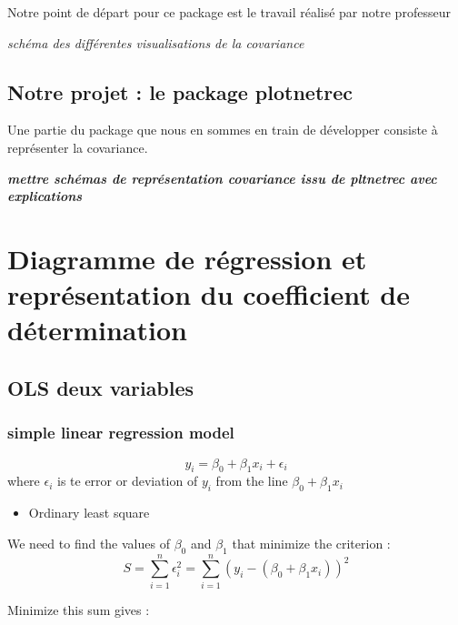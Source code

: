 \documentclass[
]{report}
\providecommand{\tightlist}{%
  \setlength{\itemsep}{0pt}\setlength{\parskip}{0pt}}
\begin{document}
Notre point de départ pour ce package est le travail réalisé par notre professeur \citep{bousquet}

\emph{schéma des différentes visualisations de la covariance}

\hypertarget{notre-projet-le-package-plotnetrec}{%
\section{Notre projet : le package plotnetrec}\label{notre-projet-le-package-plotnetrec}}

Une partie du package que nous en sommes en train de développer consiste à représenter la covariance.

\textbf{\emph{mettre schémas de représentation covariance issu de pltnetrec avec explications}}

\hypertarget{diagramme-de-ruxe9gression-et-repruxe9sentation-du-coefficient-de-duxe9termination}{%
\chapter{Diagramme de régression et représentation du coefficient de détermination}\label{diagramme-de-ruxe9gression-et-repruxe9sentation-du-coefficient-de-duxe9termination}}

\hypertarget{ols-deux-variables}{%
\section{OLS deux variables}\label{ols-deux-variables}}

\hypertarget{simple-linear-regression-model}{%
\subsection{simple linear regression model}\label{simple-linear-regression-model}}

\[y_i = \beta_0 + \beta_1x_i +  \epsilon_i\]
where \(\epsilon_i\) is te error or deviation of \(y_i\) from the line \(\beta_0 + \beta_1x_i\)

\begin{itemize}
\tightlist
\item
  Ordinary least square
\end{itemize}

We need to find the values of \(\beta_0\) and \(\beta_1\) that minimize the criterion :
\[S = \sum_{i=1}^n \epsilon_i^2 = \sum_{i=1}^n (y_i - (\beta_0 + \beta_1x_i))^2\]

Minimize this sum gives :
\end{document}
